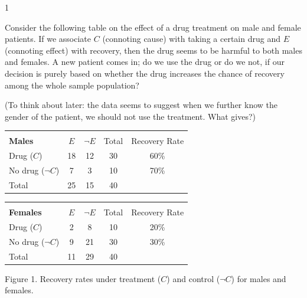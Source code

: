 \documentclass[12pt]{article}
\begin{document}


\begin{problem}{1}

    Consider the following table on the effect of a drug treatment on male and female patients.
    If we associate $C$ (connoting cause) with taking a certain drug and $E$ (connoting effect)
    with recovery, then the drug seems to be harmful to both males and females. A new patient
    comes in; do we use the drug or do we not, if our decision is purely based on whether the
    drug increases the chance of recovery among the whole sample population?

    (To think about later: the data seems to suggest when we further know the gender of the
    patient, we should not use the treatment. What gives?)

    \begin{center}
    \begin{tabular}{lcccc}
    \multicolumn{5}{c}{} \\
    \textbf{Males} & $E$ & $\neg E$ & Total & Recovery Rate \\
    \hline
    Drug ($C$) & 18 & 12 & 30 & 60\% \\
    No drug ($\neg C$) & 7 & 3 & 10 & 70\% \\
    \hline
    Total & 25 & 15 & 40 & \\
    \hline
    \end{tabular}

    \vspace{1em}

    \begin{tabular}{lcccc}
    \multicolumn{5}{c}{}\\
    \textbf{Females} & $E$ & $\neg E$ & Total & Recovery Rate \\
    \hline
    Drug ($C$) & 2 & 8 & 10 & 20\% \\
    No drug ($\neg C$) & 9 & 21 & 30 & 30\% \\
    \hline
    Total & 11 & 29 & 40 & \\
    \hline
    \end{tabular}
    \end{center}
    Figure 1. Recovery rates under treatment ($C$) and control ($\neg C$) for males and females.
\end{problem}
\end{document}

